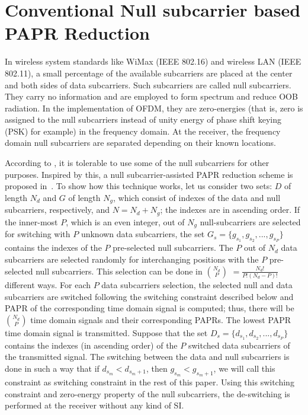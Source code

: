 \documentclass[journal,comsoc]{IEEEtran}
\begin{document}
\section{Conventional Null subcarrier based PAPR Reduction}


In wireless system standards like WiMax (IEEE 802.16) and wireless LAN (IEEE 802.11), a small percentage of the available subcarriers are placed at the center and both sides of data subcarriers. Such subcarriers are called null subcarriers. They carry no information and are employed to form spectrum and reduce OOB radiation. In the implementation of OFDM, they are zero-energies (that is, zero is assigned to the null subcarriers instead of unity energy of phase shift keying (PSK) for example) in the frequency domain. At the receiver, the frequency domain null subcarriers are separated depending on their known locations. 

According to \cite{Li}, it is tolerable to use some of the null subcarriers for other purposes. Inspired by this, a null subcarrier-assisted PAPR reduction scheme is proposed in~\cite{wong1}. To show how this technique works, let us consider two sets: $D$ of length $N_d$ and $G$ of length $N_g$, which consist of indexes of the data and null subcarriers, respectively, and $N=N_d+N_g$; the indexes are in ascending order. If the inner-most $P$, which is an even integer, out of $N_g$ null-subcarriers are selected for switching with $P$ unknown data subcarriers, the set $G_s=\{g_{s_1},g_{s_2},...,g_{s_P}\}$   contains the indexes of the $P$ pre-selected null subcarriers. The $P$ out of $N_d$ data subcarriers are selected randomly for interchanging positions with the $P$ pre-selected null subcarriers. This selection can be done in $N_d \choose P$ $=\frac{N_d!}{P!(N_d-P)!}$ different ways. For each $P$ data subcarriers selection, the selected null and data subcarriers are switched following the switching constraint described below and PAPR of the corresponding time domain signal is computed; thus, there will be $N_d \choose P$ time domain signals and their corresponding PAPRs. The lowest PAPR time domain signal is transmitted. Suppose that the set $D_s=\{d_{s_1},d_{s_2},...,d_{s_P}\}$    contains the indexes (in ascending order) of the $P$ switched data subcarriers of the transmitted signal. The switching between the data and null subcarriers is done in such a way that if    $d_{s_m}<d_{s_m+1}$, then $g_{s_m}<g_{s_m+1}$, we will call this constraint as switching constraint in the rest of this paper. Using this switching constraint and zero-energy property of the null subcarriers, the de-switching is performed at the receiver without any kind of SI. 
\end{document}
